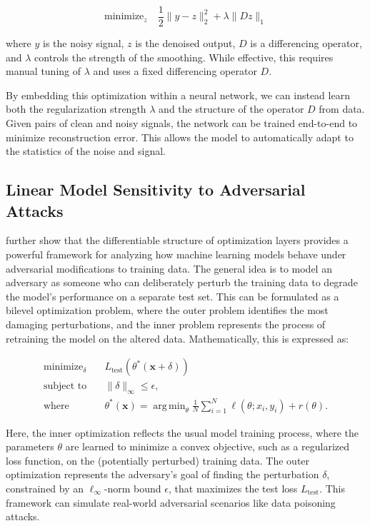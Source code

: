 \documentclass{article}
\DeclareMathOperator*{\argmin}{arg\,min}
\begin{document}
\begin{equation}
\text{minimize}_z \quad \frac{1}{2}\|y - z\|_2^2 + \lambda\|Dz\|_1
\end{equation}

where $y$ is the noisy signal, $z$ is the denoised output, $D$ is a differencing operator, and $\lambda$ controls the strength of the smoothing. While effective, this requires manual tuning of $\lambda$ and uses a fixed differencing operator $D$.

By embedding this optimization within a neural network, we can instead learn both the regularization strength $\lambda$ and the structure of the operator $D$ from data. Given pairs of clean and noisy signals, the network can be trained end-to-end to minimize reconstruction error. This allows the model to automatically adapt to the statistics of the noise and signal.


\subsection{Linear Model Sensitivity to Adversarial Attacks}

\citet{differentiableconvexoptimizationlayers} further show that the differentiable structure of optimization layers provides a powerful framework for analyzing how machine learning models behave under adversarial modifications to training data. The general idea is to model an adversary as someone who can deliberately perturb the training data to degrade the model's performance on a separate test set. This can be formulated as a bilevel optimization problem, where the outer problem identifies the most damaging perturbations, and the inner problem represents the process of retraining the model on the altered data. Mathematically, this is expressed as:

\begin{equation}
\begin{aligned}
\text{minimize}_{\delta} \quad & L_{\text{test}}(\theta^*(\mathbf{x} + \delta)) \\
\text{subject to} \quad & \|\delta\|_\infty \leq \epsilon, \\
\text{where} \quad & \theta^*(\mathbf{x}) = \argmin_\theta \frac{1}{N}\sum_{i=1}^N \ell(\theta; x_i, y_i) + r(\theta).
\end{aligned}
\end{equation}

Here, the inner optimization reflects the usual model training process, where the parameters \(\theta\) are learned to minimize a convex objective, such as a regularized loss function, on the (potentially perturbed) training data. The outer optimization represents the adversary’s goal of finding the perturbation \(\delta\), constrained by an \(\ell_\infty\)-norm bound \(\epsilon\), that maximizes the test loss \(L_{\text{test}}\). This framework can simulate real-world adversarial scenarios like data poisoning attacks.
\end{document}
